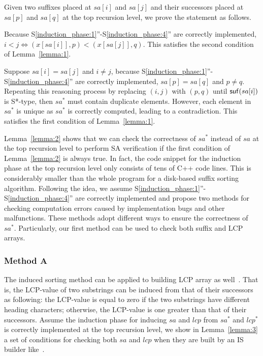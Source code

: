 \documentclass[10pt,journal,compsoc]{IEEEtran}
\begin{document}
\begin{IEEEproof} Given two suffixes placed at $sa[i]$ and $sa[j]$ and their successors placed at $sa[p]$ and $sa[q]$ at the top recursion level, we prove the statement as follows.

Because S\ref{induction_phase:1}''-S\ref{induction_phase:4}'' are correctly implemented, $i < j \iff (x[sa[i]], p) < (x[sa[j]], q)$. This satisfies the second condition of Lemma~\ref{lemma:1}.

Suppose $sa[i] = sa[j]$ and $i \ne j$, because S\ref{induction_phase:1}''-S\ref{induction_phase:4}'' are correctly implemented, $sa[p] = sa[q]$ and $p \ne q$. Repeating this reasoning process by replacing $(i, j)$ with $(p, q)$ until ${\sf suf}(sa[i])$ is S*-type, then $sa^*$ must contain duplicate elements. However, each element in $sa^*$ is unique as $sa^*$ is correctly computed, leading to a contradiction. This satisfies the first condition of Lemma~\ref{lemma:1}.

\end{IEEEproof}

Lemma~\ref{lemma:2} shows that we can check the correctness of $sa^*$ instead of $sa$ at the top recursion level to perform SA verification if the first condition of Lemma~\ref{lemma:2} is always true. In fact, the code snippet for the induction phase at the top recursion level only consists of tens of C++ code lines. This is considerably smaller than the whole program for a disk-based suffix sorting algorithm. Following the idea, we assume S\ref{induction_phase:1}''-S\ref{induction_phase:4}'' are correctly implemented and propose two methods for checking computation errors caused by implementation bugs and other malfunctions. These methods adopt different ways to ensure the correctness of $sa^*$. Particularly, our first method can be used to check both suffix and LCP arrays.  

\subsubsection{Method A} \label{sec:proposals:method_a}

The induced sorting method can be applied to building LCP array as well~\cite{Fischer11}. That is, the LCP-value of two substrings can be induced from that of their successors as following: the LCP-value is equal to zero if the two substrings have different heading characters; otherwise, the LCP-value is one greater than that of their successors. Assume the induction phase for inducing $sa$ and $lcp$ from $sa^*$ and $lcp^*$ is correctly implemented at the top recursion level, we show in Lemma~\ref{lemma:3} a set of conditions for checking both $sa$ and $lcp$ when they are built by an IS builder like~\cite{Fischer11, Bingmann12}.
\end{document}
